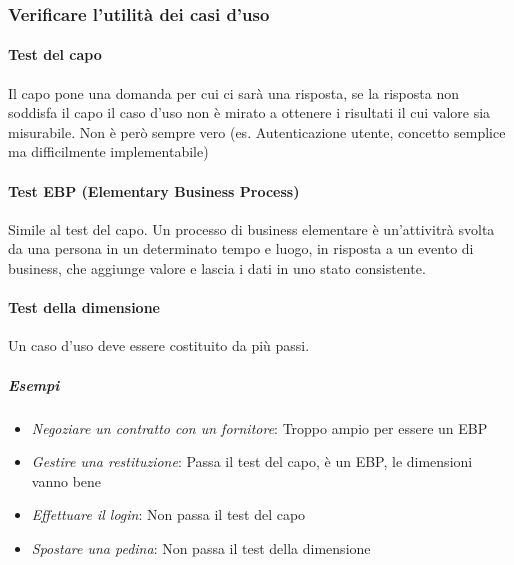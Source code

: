 \documentclass[12pt]{article}
\begin{document}
\subsubsection{Verificare l'utilità dei casi d'uso}
\paragraph{Test del capo} Il capo pone una domanda per cui ci sarà una risposta, se la risposta non soddisfa il capo il caso d'uso non è mirato a ottenere i risultati il cui valore sia misurabile. Non è però sempre vero (es. Autenticazione utente, concetto semplice ma difficilmente implementabile)
\paragraph{Test EBP (Elementary Business Process)} Simile al test del capo. Un processo di business elementare è un'attivitrà svolta da una persona in un determinato tempo e luogo, in risposta a un evento di business, che aggiunge valore e lascia i dati in uno stato consistente.
\paragraph{Test della dimensione} Un caso d'uso deve essere costituito da più passi.
\subparagraph{Esempi}
\begin{itemize}
    \item \textit{Negoziare un contratto con un fornitore}: Troppo ampio per essere un EBP
    \item \textit{Gestire una restituzione}: Passa il test del capo, è un EBP, le dimensioni vanno bene
    \item \textit{Effettuare il login}: Non passa il test del capo
    \item \textit{Spostare una pedina}: Non passa il test della dimensione
\end{itemize} 
\end{document}
